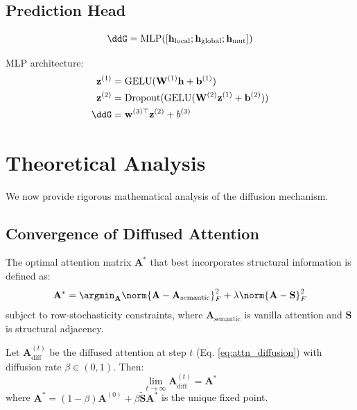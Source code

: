 \documentclass[12pt,en]{elegantpaper}
\begin{document}
\subsection{Prediction Head}

\begin{equation}
    \ddG = \text{MLP}([\mathbf{h}_{\text{local}}; \mathbf{h}_{\text{global}}; \mathbf{h}_{\text{mut}}])
\end{equation}

MLP architecture:
\begin{align}
    \mathbf{z}^{(1)} &= \text{GELU}(\mathbf{W}^{(1)} \mathbf{h} + \mathbf{b}^{(1)}) \\
    \mathbf{z}^{(2)} &= \text{Dropout}(\text{GELU}(\mathbf{W}^{(2)} \mathbf{z}^{(1)} + \mathbf{b}^{(2)})) \\
    \ddG &= \mathbf{w}^{(3)\top} \mathbf{z}^{(2)} + b^{(3)}
\end{align}

\section{Theoretical Analysis}
\label{sec:theory}

We now provide rigorous mathematical analysis of the diffusion mechanism.

\subsection{Convergence of Diffused Attention}

\begin{definition}
The optimal attention matrix $\mathbf{A}^*$ that best incorporates structural information is defined as:
\begin{equation}
    \mathbf{A}^* = \argmin_{\mathbf{A}} \norm{\mathbf{A} - \mathbf{A}_{\text{semantic}}}^2_F + \lambda \norm{\mathbf{A} - \mathbf{S}}^2_F
\end{equation}
subject to row-stochasticity constraints, where $\mathbf{A}_{\text{semantic}}$ is vanilla attention and $\mathbf{S}$ is structural adjacency.
\end{definition}

\begin{theorem}
\label{thm:convergence}
Let $\mathbf{A}_{\text{diff}}^{(t)}$ be the diffused attention at step $t$ (Eq. \ref{eq:attn_diffusion}) with diffusion rate $\beta \in (0,1)$. Then:
\begin{equation}
    \lim_{t \to \infty} \mathbf{A}_{\text{diff}}^{(t)} = \mathbf{A}^*
\end{equation}
where $\mathbf{A}^* = (1-\beta) \mathbf{A}^{(0)} + \beta \mathbf{\tilde{S}} \mathbf{A}^*$ is the unique fixed point.
\end{theorem}
\end{document}
